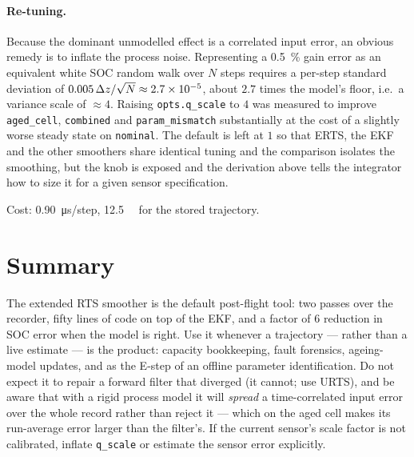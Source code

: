 \paragraph{Re-tuning.}  Because the dominant unmodelled effect is a correlated input error, an
obvious remedy is to inflate the process noise.  Representing a \SI{0.5}{\percent} gain error as an
equivalent white SOC random walk over $N$ steps requires a per-step standard deviation of
$0.005\,\Delta z/\sqrt{N}\approx2.7\times10^{-5}$, about $2.7$ times the model's floor, i.e.\ a
variance scale of $\approx4$.  Raising \texttt{opts.q\_scale} to $4$ was measured to improve \texttt{aged\_cell},
\texttt{combined} and \texttt{param\_mismatch} substantially at the cost of a slightly worse steady
state on \texttt{nominal}.  The default is left at $1$ so that ERTS, the EKF and the other smoothers
share identical tuning and the comparison isolates the smoothing, but the knob is exposed and the
derivation above tells the integrator how to size it for a given sensor specification.

Cost: \SI{0.90}{\micro\second}/step, \SI{12.5}{\mega\byte} for the stored trajectory.

\section{Summary}
The extended RTS smoother is the default post-flight tool: two passes over the recorder, fifty lines
of code on top of the EKF, and a factor of $6$ reduction in SOC error when the model is right.
Use it whenever a trajectory --- rather than a live estimate --- is the product: capacity
bookkeeping, fault forensics, ageing-model updates, and as the E-step of an offline parameter
identification.  Do not expect it to repair a forward filter that diverged (it cannot; use URTS),
and be aware that with a rigid process model it will \emph{spread} a time-correlated input error
over the whole record rather than reject it --- which on the aged cell makes its run-average error
larger than the filter's.  If the current sensor's scale factor is not calibrated, inflate
\texttt{q\_scale} or estimate the sensor error explicitly.
